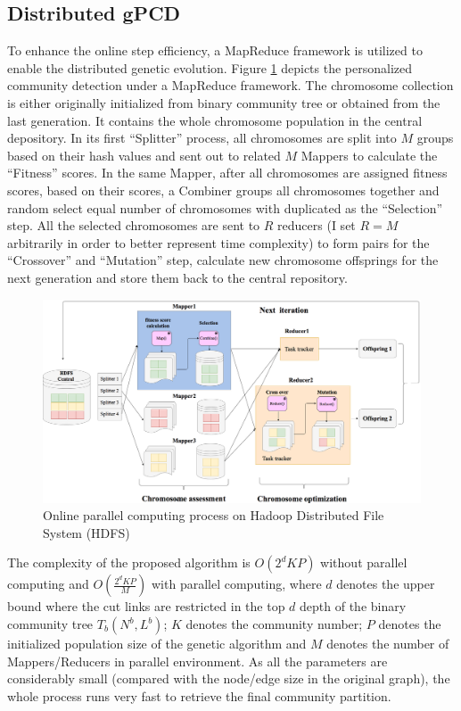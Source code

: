 \subsection{Distributed gPCD}
To enhance the online step efficiency, a MapReduce framework is utilized to enable the distributed genetic evolution. Figure \ref{fig:distributed} depicts the personalized community detection under a MapReduce framework. The chromosome collection is either originally initialized from binary community tree or obtained from the last generation. It contains the whole chromosome population in the central depository. In its first ``Splitter'' process, all chromosomes are split into $M$ groups based on their hash values and sent out to related $M$  Mappers to calculate the ``Fitness'' scores. In the same Mapper, after all chromosomes are assigned fitness scores, based on their scores, a Combiner groups all chromosomes together and random select equal number of chromosomes with duplicated as the ``Selection'' step. All the selected chromosomes are sent to $R$ reducers (I set $R = M$ arbitrarily in order to better represent time complexity) to form pairs for the ``Crossover'' and  ``Mutation'' step, calculate new chromosome offsprings for the next generation and store them back to the central repository. 
 
\begin{figure}  
	\center
	\includegraphics[width=1\columnwidth]{img/chapter3/parallel.png}
	\caption{Online parallel computing process on Hadoop Distributed File System (HDFS)}
	\label{fig:distributed}
\end{figure}

The complexity of the proposed algorithm is $O(2^dKP)$ without parallel computing and $O(\frac{2^dKP}{M})$ with  parallel computing, where $d$ denotes the upper bound where the cut links are restricted in the top $d$ depth of the binary community tree $T_{b}(N^{b},L^{b})$; $K$ denotes the community number; $P$ denotes the initialized population size of the genetic algorithm and $M$ denotes the number of Mappers/Reducers in parallel environment. As all the parameters are considerably small (compared with the node/edge size in the original graph), the whole process runs very fast to retrieve the final community partition.